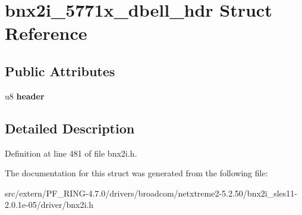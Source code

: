 \hypertarget{structbnx2i__5771x__dbell__hdr}{
\section{bnx2i\_\-5771x\_\-dbell\_\-hdr Struct Reference}
\label{structbnx2i__5771x__dbell__hdr}
}
\subsection*{Public Attributes}
\begin{DoxyCompactItemize}
\item 
\hypertarget{structbnx2i__5771x__dbell__hdr_a9fa1123a6a5d4ee5e5626b4af196b0a8}{
u8 {\bfseries header}}
\label{structbnx2i__5771x__dbell__hdr_a9fa1123a6a5d4ee5e5626b4af196b0a8}

\end{DoxyCompactItemize}


\subsection{Detailed Description}


Definition at line 481 of file bnx2i.h.



The documentation for this struct was generated from the following file:\begin{DoxyCompactItemize}
\item 
src/extern/PF\_\-RING-\/4.7.0/drivers/broadcom/netxtreme2-\/5.2.50/bnx2i\_\-sles11-\/2.0.1e-\/05/driver/bnx2i.h\end{DoxyCompactItemize}
